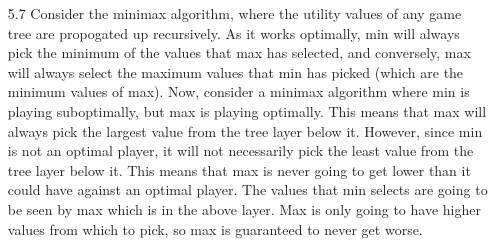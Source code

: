 \documentclass{article}
\begin{document}


\begin{enumerate}
\item[5.7] Consider the minimax algorithm, where the utility values of any game tree are propogated up recursively.  As it works optimally, min will always pick the minimum of the values that max has selected, and conversely, max will always select the maximum values that min has picked (which are the minimum values of max).  Now, consider a minimax algorithm where min is playing suboptimally, but max is playing optimally.  This means that max will always pick the largest value from the tree layer below it.  However, since min is not an optimal player, it will not necessarily pick the least value from the tree layer below it.  This means that max is never going to get lower than it could have against an optimal player.  The values that min selects are going to be seen by max which is in the above layer.  Max is only going to have higher values from which to pick, so max is guaranteed to never get worse.  


\end{enumerate}
\end{document}
